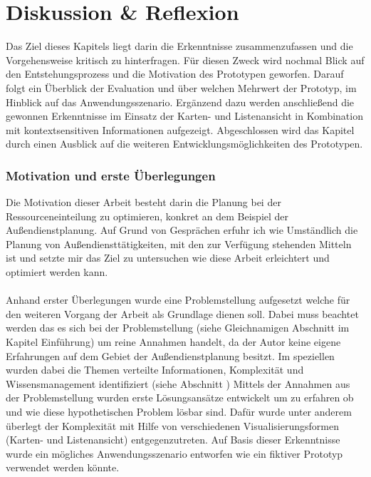 \documentclass[Bachelorarbeit.tex]{subfiles}
\begin{document}
\chapter{Diskussion \& Reflexion}
\label{chap:reflexion}

\label{chap:reflexion:sec:zusammenfassung}
Das Ziel dieses Kapitels liegt darin die Erkenntnisse zusammenzufassen und die Vorgehensweise kritisch zu hinterfragen.
Für diesen Zweck wird nochmal Blick auf den Entstehungsprozess und die Motivation des Prototypen geworfen.
Darauf folgt ein Überblick der Evaluation und über welchen Mehrwert der Prototyp, im Hinblick auf das Anwendungsszenario.
Ergänzend dazu werden anschließend die gewonnen Erkenntnisse im Einsatz der Karten- und Listenansicht in Kombination mit kontextsensitiven Informationen aufgezeigt.
Abgeschlossen wird das Kapitel durch einen Ausblick auf die weiteren Entwicklungsmöglichkeiten des Prototypen. 

\subsection*{Motivation und erste Überlegungen}
Die Motivation dieser Arbeit besteht darin die Planung bei der Ressourceneinteilung zu optimieren, konkret an dem Beispiel der Außendienstplanung. 
Auf Grund von Gesprächen erfuhr ich wie Umständlich die Planung von Außendiensttätigkeiten, mit den zur Verfügung stehenden Mitteln ist und setzte mir das Ziel zu untersuchen wie diese Arbeit erleichtert und optimiert werden kann.\\
\\
Anhand erster Überlegungen wurde eine Problemstellung aufgesetzt welche für den weiteren Vorgang der Arbeit als Grundlage dienen soll. 
Dabei muss beachtet werden das es sich bei der Problemstellung (siehe Gleichnamigen Abschnitt im Kapitel Einführung) um reine Annahmen handelt, da der Autor keine eigene Erfahrungen auf dem Gebiet der Außendienstplanung besitzt.
Im speziellen wurden dabei die Themen verteilte Informationen, Komplexität und Wissensmanagement identifiziert (siehe Abschnitt )
Mittels der Annahmen aus der Problemstellung wurden erste Lösungsansätze entwickelt um zu erfahren ob und wie diese hypothetischen Problem lösbar sind.
Dafür wurde unter anderem überlegt der Komplexität mit Hilfe von verschiedenen Visualisierungsformen (Karten- und Listenansicht) entgegenzutreten.
Auf Basis dieser Erkenntnisse wurde ein mögliches Anwendungsszenario entworfen wie ein fiktiver Prototyp verwendet werden könnte.
\end{document}
